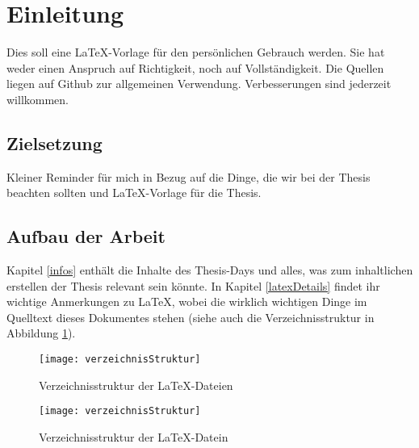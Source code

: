\section{Einleitung}
Dies soll eine \LaTeX{}-Vorlage für den persönlichen Gebrauch werden. Sie hat weder einen Anspruch auf Richtigkeit, noch auf Vollständigkeit. Die Quellen liegen auf Github zur allgemeinen Verwendung. Verbesserungen sind jederzeit willkommen.

\subsection{Zielsetzung}
Kleiner Reminder für mich in Bezug auf die Dinge, die wir bei der Thesis beachten sollten und \LaTeX{}-Vorlage für die Thesis.

\subsection{Aufbau der Arbeit}
Kapitel \ref{infos} enthält die Inhalte des Thesis-Days und alles, was zum inhaltlichen erstellen der Thesis relevant sein könnte. In Kapitel \ref{latexDetails}  findet ihr wichtige Anmerkungen zu \LaTeX{}, wobei die wirklich wichtigen Dinge im Quelltext dieses Dokumentes stehen (siehe auch die Verzeichnisstruktur in Abbildung \ref{fig:verzeichnisStruktur}).


\begin{figure}[H]
  \begin{center}
    \texttt{[image: verzeichnisStruktur]}
    \caption{Verzeichnisstruktur der \LaTeX{}-Dateien}
  \end{center}
\end{figure}

\begin{figure}[H]
 \centerline{\texttt{[image: verzeichnisStruktur]}}
 \caption{Verzeichnisstruktur der \LaTeX{}-Datein}\label{fig:verzeichnisStruktur}
\end{figure}

